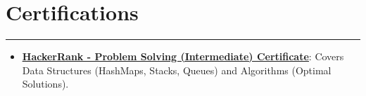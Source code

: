 \documentclass[a4paper,10.5pt]{article}  %
\begin{document}
\section*{Certifications}
\vspace{-.3em}
\hrule
\vspace{0.4em}
\begin{itemize}
    \item \textbf{\href{https://www.hackerrank.com/certificates/0546eb7d14c4}{\underline{HackerRank - Problem Solving (Intermediate) Certificate}}}: Covers Data Structures (HashMaps, Stacks, Queues) and Algorithms (Optimal Solutions).
\end{itemize}
\end{document}
